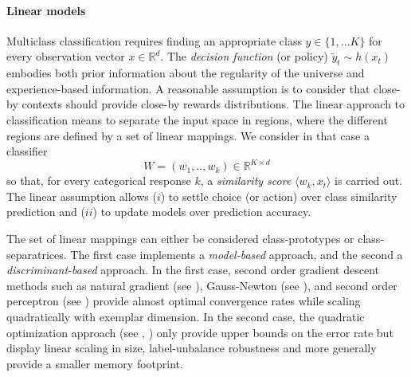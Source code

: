 \documentclass[preprint,12pt,authoryear]{elsarticle}
\begin{document}
\paragraph{Linear models}
Multiclass classification requires  finding an appropriate class $y \in \{1,... K\}$ for every observation vector $x \in \mathbb{R}^d$.
The \textit{decision function} (or policy) $\tilde{y}_t \sim h(x_t)$ embodies both prior information about the regularity of the universe and experience-based information. A reasonable assumption  is to consider that  close-by contexts should provide close-by rewards distributions. 
The linear approach to classification means to separate the input space in regions, where the different regions are defined by a set of linear mappings. We consider in that case a  classifier 
\begin{equation}\label{eq:W}
W = (w_1,..,w_k) \in \mathbb{R}^{K \times d}
\end{equation} so that, for every categorical response $k$, a \emph{similarity score} $\langle w_k, x_t\rangle$ is carried out. 
The linear assumption allows ($i$) to 
settle choice (or action) over class similarity prediction and ($ii$) to update models over prediction accuracy.

The set of linear mappings can either be considered class-prototypes or class-separatrices. The first case implements a \textit{model-based} approach, and the second a \textit{discriminant-based} approach. In the first case,  second order gradient descent methods such as natural gradient (see \cite{amari2000adaptive}), Gauss-Newton (see \cite{le2004large}), and second order perceptron (see \cite{cesa2005second}) provide almost optimal convergence rates while scaling quadratically with exemplar dimension.
In the second case, the quadratic optimization approach (see \cite{anlauf1989adatron}, \cite{crammer2006online}) only provide upper bounds on the error rate but display linear scaling in size, label-unbalance robustness and more generally provide a smaller memory footprint. 
\end{document}

